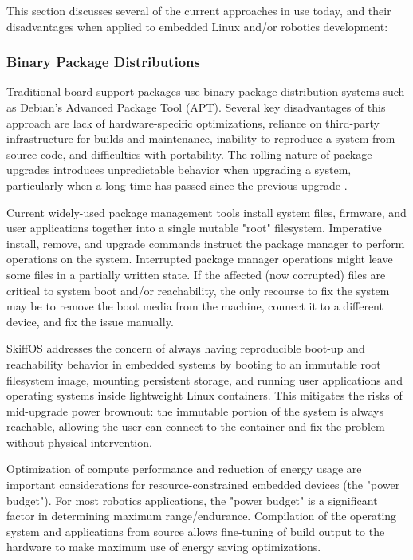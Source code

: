 \documentclass[english,]{IEEEtran}
\begin{document}
This section discusses several of the current approaches in use today,
and their disadvantages when applied to embedded Linux and/or robotics
development:

\hypertarget{binary-package-distributions}{%
\subsubsection{Binary Package
Distributions}\label{binary-package-distributions}}

Traditional board-support packages use binary package distribution
systems such as Debian's Advanced Package Tool (APT). Several key
disadvantages of this approach are lack of hardware-specific
optimizations, reliance on third-party infrastructure for builds and
maintenance, inability to reproduce a system from source code, and
difficulties with portability. The rolling nature of package upgrades
introduces unpredictable behavior when upgrading a system, particularly
when a long time has passed since the previous upgrade \autocite{foss}.

Current widely-used package management tools install system files,
firmware, and user applications together into a single mutable "root"
filesystem. Imperative install, remove, and upgrade commands instruct
the package manager to perform operations on the system. Interrupted
package manager operations might leave some files in a partially written
state. If the affected (now corrupted) files are critical to system boot
and/or reachability, the only recourse to fix the system may be to
remove the boot media from the machine, connect it to a different
device, and fix the issue manually.

SkiffOS addresses the concern of always having reproducible boot-up and
reachability behavior in embedded systems by booting to an immutable
root filesystem image, mounting persistent storage, and running user
applications and operating systems inside lightweight Linux containers.
This mitigates the risks of mid-upgrade power brownout: the immutable
portion of the system is always reachable, allowing the user can connect
to the container and fix the problem without physical intervention.

Optimization of compute performance and reduction of energy usage are
important considerations for resource-constrained embedded devices (the
"power budget"). For most robotics applications, the "power budget" is a
significant factor in determining maximum range/endurance. Compilation
of the operating system and applications from source allows fine-tuning
of build output to the hardware to make maximum use of energy saving
optimizations.
\end{document}
